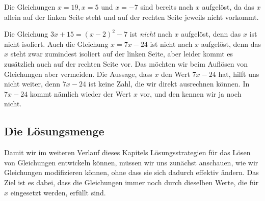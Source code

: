 \documentclass[../../main.tex]{subfiles}
\begin{document}
\begin{example}{}
    Die Gleichungen $x=19, x=5$ und $x=-7$ sind bereits nach $x$ aufgelöst, da das $x$ allein auf der linken Seite steht und auf der rechten Seite jeweils nicht vorkommt.
\end{example}
\begin{example}{}
    Die Gleichung $3x+15=(x-2)^2-7$ ist \emph{nicht} nach $x$ aufgelöst, denn das $x$ ist nicht isoliert. Auch die Gleichung $x=7x-24$ ist nicht nach $x$ aufgelöst, denn das $x$ steht zwar zumindest isoliert auf der linken Seite, aber leider kommt es zusätzlich auch auf der rechten Seite vor. Das möchten wir beim Auflösen von Gleichungen aber vermeiden. Die Aussage, dass $x$ den Wert $7x-24$ hat, hilft uns nicht weiter, denn $7x-24$ ist keine Zahl, die wir direkt ausrechnen können. In $7x-24$ kommt nämlich wieder der Wert $x$ vor, und den kennen wir ja noch nicht.
\end{example}

\subsection{Die Lösungsmenge}

Damit wir im weiteren Verlauf dieses Kapitels Lösungsstrategien für das Lösen von Gleichungen entwickeln können, müssen wir uns zunächst anschauen, wie wir Gleichungen modifizieren können, ohne dass sie sich dadurch effektiv ändern. Das Ziel ist es dabei, dass die Gleichungen immer noch durch dieselben Werte, die für $x$ eingesetzt werden, erfüllt sind.
\end{document}
